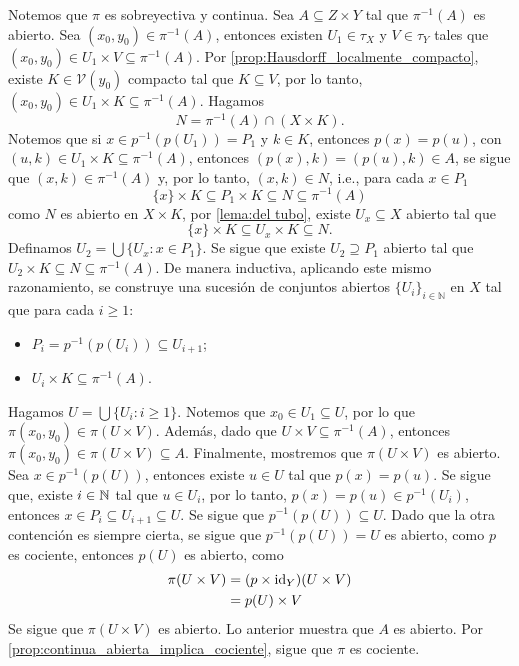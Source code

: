 \begin{dem}
    Notemos que $\pi$ es sobreyectiva y continua. Sea $A\subseteq Z\times Y$ tal que $\pi^{-1}(A)$ es abierto. Sea $(x_0,y_0)\in \pi^{-1}(A)$, entonces existen $U_1\in \tau_X$ y $V\in \tau_Y$ tales que $(x_0,y_0)\in U_1\times V\subseteq \pi^{-1}(A)$. Por \ref{prop:Hausdorff_localmente_compacto}, existe $K\in\mathcal{V}(y_0)$ compacto tal que $K\subseteq V$, por lo tanto, $(x_0,y_0)\in U_1\times K\subseteq \pi^{-1}(A)$. Hagamos 
    \[
    N=\pi^{-1}(A)\cap (X\times K).
    \]
    Notemos que si $x\in p^{-1}(p(U_1))=P_1$ y $k\in K$, entonces $p(x)=p(u)$, con $(u,k)\in U_1\times K\subseteq\pi^{-1}(A)$, entonces $(p(x),k)=(p(u),k)\in A$, se sigue que $(x,k)\in \pi^{-1}(A)$ y, por lo tanto, $(x,k)\in N$, i.e., para cada $x\in P_1$
    \[
    \{x\}\times K\subseteq P_1\times K\subseteq N\subseteq \pi^{-1}(A)
    \]
    como $N$ es abierto en $X\times K$, por \ref{lema:del tubo}, existe $U_x\subseteq X$ abierto tal que 
    \[
    \{x\}\times K\subseteq U_x\times K\subseteq N.
    \]
    Definamos $U_2=\bigcup\{U_x:x\in P_1\}$. Se sigue que existe $U_2\supseteq P_1$ abierto tal que $U_2\times K\subseteq N\subseteq \pi^{-1}(A)$. De manera inductiva, aplicando este mismo razonamiento, se construye una sucesión de conjuntos abiertos $\{U_i\}_{i\in\mathbb{N}}$ en $X$ tal que para cada $i\geq 1:$
    \begin{itemize}
        \item[(1)] $P_i= p^{-1}(p(U_i)) \subseteq U_{i+1}$;
        \item[(2)] $U_i \times K \subseteq \pi^{-1}(A)$.
    \end{itemize}
    Hagamos $U=\bigcup \{U_i:i\geq 1\}$. Notemos que $x_0\in U_1\subseteq U$, por lo que $\pi(x_0,y_0)\in \pi(U\times V)$. Además, dado que $U\times V\subseteq \pi^{-1}(A)$, entonces $\pi(x_0,y_0)\in\pi(U\times V)\subseteq A$. Finalmente, mostremos que $\pi(U\times V)$ es abierto. Sea $x\in p^{-1}(p(U))$, entonces existe $u\in U$ tal que $p(x)=p(u)$. Se sigue que, existe $i\in \mathbb{N}$ tal que $u\in U_i$, por lo tanto, $p(x)=p(u)\in p^{-1}(U_i)$, entonces $x\in P_i\subseteq U_{i+1}\subseteq U.$ Se sigue que $p^{-1}(p(U))\subseteq U$. Dado que la otra contención es siempre cierta, se sigue que $p^{-1}(p(U))= U$ es abierto, como $p$ es cociente, entonces $p(U)$ es abierto, como
    \begin{align*}
        \pi(U\times V)&=(p\times \mathrm{id}_Y)(U\times V)\\
        &=p(U)\times V
    \end{align*}
    Se sigue que $\pi(U\times V)$ es abierto. Lo anterior muestra que $A$ es abierto. Por \ref{prop:continua_abierta_implica_cociente}, sigue que $\pi$ es cociente.
\end{dem}

